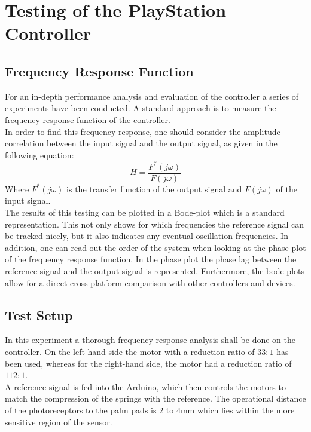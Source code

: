 \section{Testing of the PlayStation Controller} \label{sec:ps_testing}

\subsection{Frequency Response Function}%
For an in-depth performance analysis and evaluation of the controller a series of experiments have been conducted. A standard approach is to measure the frequency response function of the controller.\\
In order to find this frequency response, one should consider the amplitude correlation between the input signal and the output signal, as given in the following equation:
\begin{equation}
	H = \frac{F^*(j\omega)}{F(j\omega)}
\end{equation}
Where $F^*(j\omega)$ is the transfer function of the output signal and $F(j\omega)$ of the input signal.\\
The results of this testing can be plotted in a Bode-plot which is a standard representation. This not only shows for which frequencies the reference signal can be tracked nicely, but it also indicates any eventual oscillation frequencies. In addition, one can read out the order of the system when looking at the phase plot of the frequency response function. In the phase plot the phase lag between the reference signal and the output signal is represented. Furthermore, the bode plots allow for a direct cross-platform comparison with other controllers and devices.

\subsection{Test Setup}
In this experiment a thorough frequency response analysis shall be done on the controller. On the left-hand side the motor with a reduction ratio of $33:1$ has been used, whereas for the right-hand side, the motor had a reduction ratio of $112:1$. \\
A reference signal is fed into the Arduino, which then controls the motors to match the compression of the springs with the reference. The operational distance of the photoreceptors to the palm pads is $2$ to $4$mm which lies within the more sensitive region of the sensor.
	
